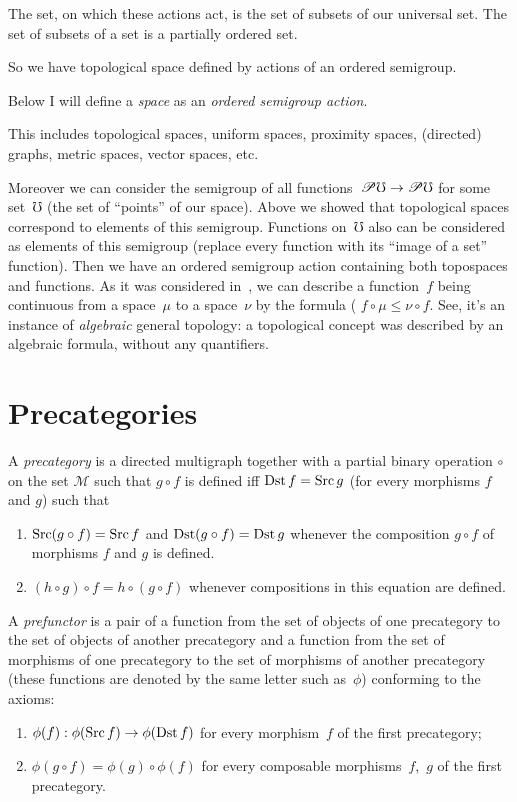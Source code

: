 The set, on which these actions act, is the set of subsets of our universal set. The set of subsets of a set is a partially ordered set.

So we have topological space defined by actions of an ordered semigroup.

Below I will define a \emph{space} as an \emph{ordered semigroup action}.

This includes topological spaces, uniform spaces, proximity spaces, (directed) graphs, metric spaces, vector spaces, etc.

Moreover we can consider the semigroup of all functions~$\mathscr{P}\mho\to\mathscr{P}\mho$ for some set~$\mho$ (the set of ``points'' of our space). Above we showed that topological spaces correspond to elements of this semigroup. Functions on~$\mho$ also can be considered as elements of this semigroup (replace every function with its ``image of a set'' function). Then we have an ordered semigroup action containing both topospaces and functions. As it was considered in~\cite{volume-1}, we can describe a function~$f$ being continuous from a space~$\mu$ to a space~$\nu$ by the formula ( $f\circ\mu\leq\nu\circ f$. See, it's an instance of \emph{algebraic} general topology: a topological concept was described by an algebraic formula, without any quantifiers.

\chapter{Precategories}

\begin{defn}
A \emph{precategory} is a directed multigraph
together with a partial binary operation $\circ$ on the set $\mathcal{M}$
such that $g\circ f$ is defined iff $\operatorname{Dst} f=\operatorname{Src} g$ (for every morphisms
$f$ and $g$) such that
\begin{enumerate}
\item $\operatorname{Src}(g\circ f)=\operatorname{Src} f$ and $\operatorname{Dst}(g\circ f)=\operatorname{Dst} g$ whenever the
composition $g\circ f$ of morphisms $f$ and $g$ is defined.
\item $(h\circ g)\circ f=h\circ(g\circ f)$ whenever compositions in this
equation are defined.
\end{enumerate}
\end{defn}

\begin{defn}
A \emph{prefunctor} is a pair of a function from the set of objects of one precategory to the set of objects of another precategory and a function from the set of morphisms of one precategory to the set of morphisms of another precategory (these functions are denoted by the same letter such as~$\phi$) conforming to the axioms:
\begin{enumerate}
\item $\phi(f): \phi(\operatorname{Src} f)\to\phi(\operatorname{Dst} f)$ for every morphism~$f$ of the first precategory;
\item $\phi(g\circ f)=\phi(g)\circ\phi(f)$ for every composable morphisms~$f$,~$g$ of the first precategory.
\end{enumerate}
\end{defn}

